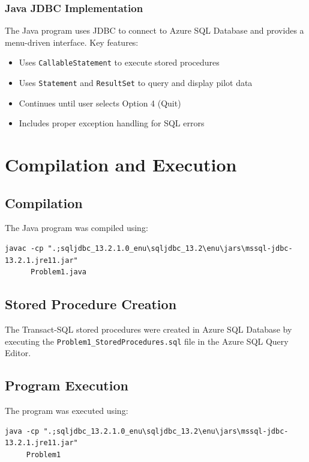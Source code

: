 \documentclass[12pt]{article}
\begin{document}
\subsubsection{Java JDBC Implementation}

The Java program uses JDBC to connect to Azure SQL Database and provides a menu-driven interface. Key features:
\begin{itemize}
    \item Uses \texttt{CallableStatement} to execute stored procedures
    \item Uses \texttt{Statement} and \texttt{ResultSet} to query and display pilot data
    \item Continues until user selects Option 4 (Quit)
    \item Includes proper exception handling for SQL errors
\end{itemize}

\newpage
\section{Compilation and Execution}

\subsection{Compilation}

The Java program was compiled using:

{\footnotesize
\begin{verbatim}
javac -cp ".;sqljdbc_13.2.1.0_enu\sqljdbc_13.2\enu\jars\mssql-jdbc-13.2.1.jre11.jar" 
      Problem1.java
\end{verbatim}
}

\subsection{Stored Procedure Creation}

The Transact-SQL stored procedures were created in Azure SQL Database by executing the \texttt{Problem1\_StoredProcedures.sql} file in the Azure SQL Query Editor.

\subsection{Program Execution}

The program was executed using:

{\footnotesize
\begin{verbatim}
java -cp ".;sqljdbc_13.2.1.0_enu\sqljdbc_13.2\enu\jars\mssql-jdbc-13.2.1.jre11.jar" 
     Problem1
\end{verbatim}
}
\end{document}
